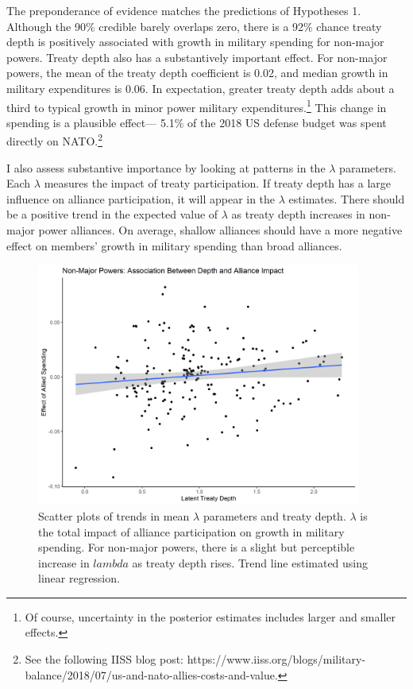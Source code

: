 \documentclass[12pt]{article}
\begin{document}
The preponderance of evidence matches the predictions of Hypotheses 1. 
Although the 90\% credible barely overlaps zero, there is a 92\% chance treaty depth is positively associated with growth in military spending for non-major powers.
Treaty depth also has a substantively important effect. 
For non-major powers, the mean of the treaty depth coefficient is 0.02, and median growth in military expenditures is 0.06. 
In expectation, greater treaty depth adds about a third to typical growth in minor power military expenditures.\footnote{Of course, uncertainty in the posterior estimates includes larger and smaller effects.}
This change in spending is a plausible effect--- 5.1\% of the 2018 US defense budget was spent directly on NATO.\footnote{See the following IISS blog post: https://www.iiss.org/blogs/military-balance/2018/07/us-and-nato-allies-costs-and-value.} 


I also assess substantive importance by looking at patterns in the $\lambda$ parameters. 
Each $\lambda$ measures the impact of treaty participation. 
If treaty depth has a large influence on alliance participation, it will appear in the $\lambda$ estimates. 
There should be a positive trend in the expected value of $\lambda$ as treaty depth increases in non-major power alliances.
On average, shallow alliances should have a more negative effect on members' growth in military spending than broad alliances.  


\begin{figure}[htbp]
	\centering
		\includegraphics[width=0.95\textwidth]{../figures/lambda-ld-nonmaj.png}
	\caption{Scatter plots of trends in mean $\lambda$ parameters and treaty depth. $\lambda$ is the total impact of alliance participation on growth in military spending. For non-major powers, there is a slight but perceptible increase in $lambda$ as treaty depth rises. Trend line estimated using linear regression.}
	\label{fig:lambda-ls-scatter}
\end{figure}
\end{document}
